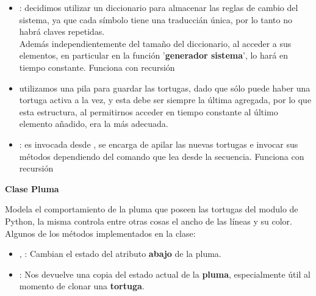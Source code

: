 \documentclass{article}
\begin{document}
	\begin{itemize}
		\item {}: decidimos utilizar un diccionario para almacenar las reglas de cambio del sistema, ya que cada s\'imbolo tiene una traducci\'an \'unica, por lo tanto no habr\'a claves repetidas. \\
		Adem\'as independientemente del tamaño del diccionario, al acceder a sus elementos, en particular en la funci\'on '\textbf{\textbf{generador \textunderscore sistema}}', lo har\'a en tiempo constante. Funciona con recursi\'on \\

		\item {} utilizamos una pila para guardar las tortugas, dado que s\'olo puede haber una tortuga activa a la vez, y esta debe ser siempre la \'ultima agregada, por lo que esta estructura, al permitirnos acceder en 				tiempo constante al \'ultimo elemento añadido, era la m\'as adecuada. \\

		\item {} : es invocada desde , se encarga de apilar las nuevas tortugas e invocar sus m\'etodos dependiendo del comando que lea desde la secuencia. Funciona con recursi\'on \\[0.5cm]

	\end{itemize}

\newpage

	 \begin{huge}
		\textbf{Clase Pluma}\\[0.4cm]
	\end{huge}
	Modela el comportamiento de la pluma que poseen las tortugas del modulo  de Python, la misma controla entre otras cosas el ancho de las l\'ineas y su color.\\[0.3cm]
 	Algunos de los m\'etodos implementados en la clase:\\
	\begin{itemize}
		\item {}, : Cambian el estado del atributo \textbf{abajo}  de la pluma. \\
		\item {} : Nos devuelve una copia del estado actual de la \textbf{pluma}, especialmente \'util al momento de clonar una \textbf{tortuga}. \\[0.5cm]
	\end{itemize}
\end{document}
